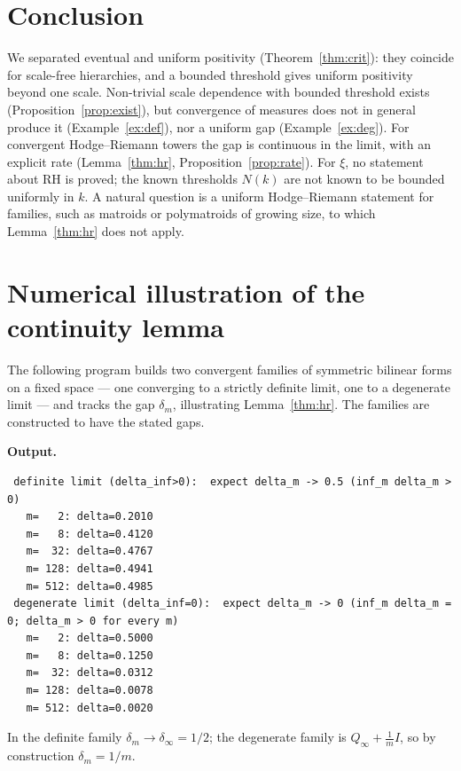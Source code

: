 \documentclass[11pt]{amsart}
\theoremstyle{definition}
\theoremstyle{remark}
\begin{document}
\section{Conclusion}
We separated eventual and uniform positivity (Theorem~\ref{thm:crit}): they
coincide for scale-free hierarchies, and a bounded threshold gives uniform
positivity beyond one scale. Non-trivial scale dependence with bounded threshold
exists (Proposition~\ref{prop:exist}), but convergence of measures does not in
general produce it (Example~\ref{ex:def}), nor a uniform gap
(Example~\ref{ex:deg}). For convergent
Hodge--Riemann towers the gap is continuous in the limit, with an explicit rate
(Lemma~\ref{thm:hr}, Proposition~\ref{prop:rate}). For $\xi$, no statement about
RH is proved; the known thresholds $N(k)$ are not known to be bounded uniformly
in $k$. A natural question is a uniform Hodge--Riemann
statement for families, such as matroids or polymatroids of growing size, to
which Lemma~\ref{thm:hr} does not apply.

\appendix
\section{Numerical illustration of the continuity lemma}\label{app:code}
The following program builds two convergent families of symmetric bilinear forms
on a fixed space --- one converging to a strictly definite limit, one to a
degenerate limit --- and tracks the gap $\delta_m$, illustrating
Lemma~\ref{thm:hr}. The families are constructed to have the stated gaps.



\medskip\noindent\textbf{Output.}
\begin{lstlisting}
 definite limit (delta_inf>0):  expect delta_m -> 0.5 (inf_m delta_m > 0)
   m=   2: delta=0.2010
   m=   8: delta=0.4120
   m=  32: delta=0.4767
   m= 128: delta=0.4941
   m= 512: delta=0.4985
 degenerate limit (delta_inf=0):  expect delta_m -> 0 (inf_m delta_m = 0; delta_m > 0 for every m)
   m=   2: delta=0.5000
   m=   8: delta=0.1250
   m=  32: delta=0.0312
   m= 128: delta=0.0078
   m= 512: delta=0.0020
\end{lstlisting}
In the definite family $\delta_m\to\delta_\infty=1/2$; the degenerate family is
$Q_\infty+\tfrac1mI$, so by construction $\delta_m=1/m$.
\end{document}

